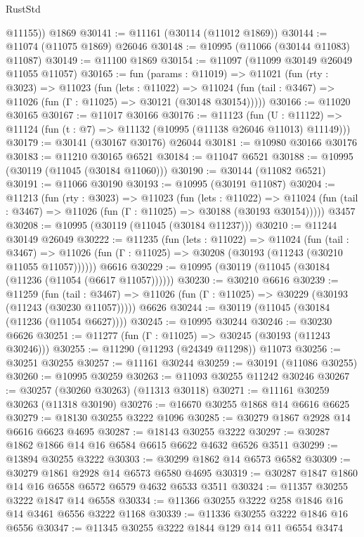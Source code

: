 \begin{lexlean}{RustStd}
\begin{coremodule}
        @11155))
    @1869
@30141 := @11161 (@30114 (@11012 @1869))
@30144 := @11074 (@11075 @1869) @26046
@30148 := @10995 (@11066 (@30144 @11083) @11087)
@30149 := @11100 @1869
@30154 := @11097 (@11099 @30149 @26049 @11055 @11057)
@30165 := fun (params : @11019) =>
  @11021
    (fun (rty : @3023) =>
    @11023
      (fun (lets : @11022) =>
      @11024 (fun (tail : @3467) => @11026 (fun (Γ : @11025) => @30121 (@30148 @30154)))))
@30166 := @11020 @30165
@30167 := @11017 @30166
@30176 := @11123
    (fun (U : @11122) => @11124 (fun (t : @7) => @11132 (@10995 (@11138 @26046 @11013) @11149)))
@30179 := @30141 (@30167 @30176) @26044
@30181 := @10980 @30166 @30176
@30183 := @11210 @30165 @6521
@30184 := @11047 @6521
@30188 := @10995 (@30119 (@11045 (@30184 @11060)))
@30190 := @30144 (@11082 @6521)
@30191 := @11066 @30190
@30193 := @10995 (@30191 @11087)
@30204 := @11213
    (fun (rty : @3023) =>
    @11023
      (fun (lets : @11022) =>
      @11024 (fun (tail : @3467) => @11026 (fun (Γ : @11025) => @30188 (@30193 @30154)))))
    @3457
@30208 := @10995 (@30119 (@11045 (@30184 @11237)))
@30210 := @11244 @30149 @26049
@30222 := @11235
    (fun (lets : @11022) =>
    @11024
      (fun (tail : @3467) =>
      @11026 (fun (Γ : @11025) => @30208 (@30193 (@11243 (@30210 @11055 @11057))))))
    @6616
@30229 := @10995 (@30119 (@11045 (@30184 (@11236 (@11054 (@6617 @11057))))))
@30230 := @30210 @6616
@30239 := @11259
    (fun (tail : @3467) => @11026 (fun (Γ : @11025) => @30229 (@30193 (@11243 (@30230 @11057)))))
    @6626
@30244 := @30119 (@11045 (@30184 (@11236 (@11054 @6627))))
@30245 := @10995 @30244
@30246 := @30230 @6626
@30251 := @11277 (fun (Γ : @11025) => @30245 (@30193 (@11243 @30246)))
@30255 := @11290 (@11293 (@24349 @11298)) @11073
@30256 := @30251 @30255
@30257 := @11161 @30244
@30259 := @30191 (@11086 @30255)
@30260 := @10995 @30259
@30263 := @11093 @30255 @11242 @30246
@30267 := @30257 (@30260 @30263) (@11313 @30118)
@30271 := @11161 @30259 @30263 (@11318 @30190)
@30276 := @16670 @30255 @1868 @14 @6616 @6625
@30279 := @18130 @30255 @3222 @1096
@30285 := @30279 @1867 @2928 @14 @6616 @6623 @4695
@30287 := @18143 @30255 @3222
@30297 := @30287 @1862 @1866 @14 @16 @6584 @6615 @6622 @4632 @6526 @3511
@30299 := @13894 @30255 @3222
@30303 := @30299 @1862 @14 @6573 @6582
@30309 := @30279 @1861 @2928 @14 @6573 @6580 @4695
@30319 := @30287 @1847 @1860 @14 @16 @6558 @6572 @6579 @4632 @6533 @3511
@30324 := @11357 @30255 @3222 @1847 @14 @6558
@30334 := @11366 @30255 @3222 @258 @1846 @16 @14 @3461 @6556 @3222 @1168
@30339 := @11336 @30255 @3222 @1846 @16 @6556
@30347 := @11345 @30255 @3222 @1844 @129 @14 @11 @6554 @3474

\end{coremodule}
\end{lexlean}
